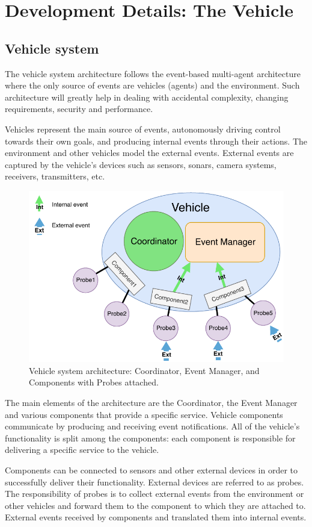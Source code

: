 \documentclass{memoir}
\begin{document}
\section{Development Details: The Vehicle}

\subsection{Vehicle system}

The vehicle system architecture follows the event-based multi-agent architecture where the only source of events are vehicles (agents) and the environment.
Such architecture will greatly help in dealing with accidental complexity, changing requirements, security and performance.


Vehicles represent the main source of events, autonomously driving control towards their own goals, and producing internal events through their actions.
The environment and other vehicles model the external events. External events are captured by the vehicle's devices such as sensors, sonars, camera systems, receivers, transmitters, etc.

\begin{figure}
	\centering
	\includegraphics[width=0.7\linewidth]{implementation_details/vehicle_high-level_architecture.pdf}
	\caption{Vehicle system architecture: Coordinator, Event Manager, and Components with Probes attached.}
	\label{fig:vehicle-architecture}
\end{figure}

The main elements of the architecture are the Coordinator, the Event Manager and various components that provide a specific service.
Vehicle components communicate by producing and receiving event notifications. All of the vehicle's functionality is split among the components: each component is responsible for delivering a specific service to the vehicle.

Components can be connected to sensors and other external devices in order to successfully deliver their functionality. External devices are referred to as probes.
The responsibility of probes is to collect external events from the environment or other vehicles and forward them to the component to which they are attached to.
External events received by components and translated them into internal events.
\end{document}
